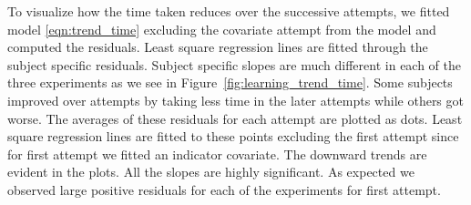 \documentclass[10pt]{article}\usepackage[]{graphicx}\usepackage[]{color}
\begin{document}

To visualize how the time taken reduces over the successive attempts, we fitted model \eqref{eqn:trend_time} excluding the covariate attempt from the model and computed the residuals. Least square regression lines are fitted through the subject specific residuals. Subject specific slopes are much different in each of the three experiments as we see in Figure~\ref{fig:learning_trend_time}. Some subjects improved over attempts by taking less time in the later attempts while others got worse. The averages of these residuals for each attempt are plotted as dots. Least square regression lines are fitted to these points excluding the first attempt since for first attempt we fitted an indicator covariate. The downward trends are evident in the plots. All the slopes are highly significant. As expected we observed large positive residuals for each of the experiments for first attempt. 





\end{document}
